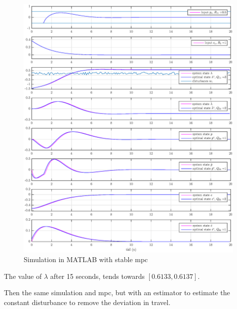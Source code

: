 \begin{figure}[h!]
    \centering
    \includegraphics[scale=0.4]{fig/heli_sim_no_est_stable.eps}
    \caption{Simulation in MATLAB with stable \acrshort{mpc}}
    \label{fig:my_label}
\end{figure}

The value of $\lambda$ after 15 seconds, tends towards $[0.6133, 0.6137]$.


Then the same simulation and \acrshort{mpc}, but with an estimator to estimate the constant disturbance to remove the deviation in travel.

